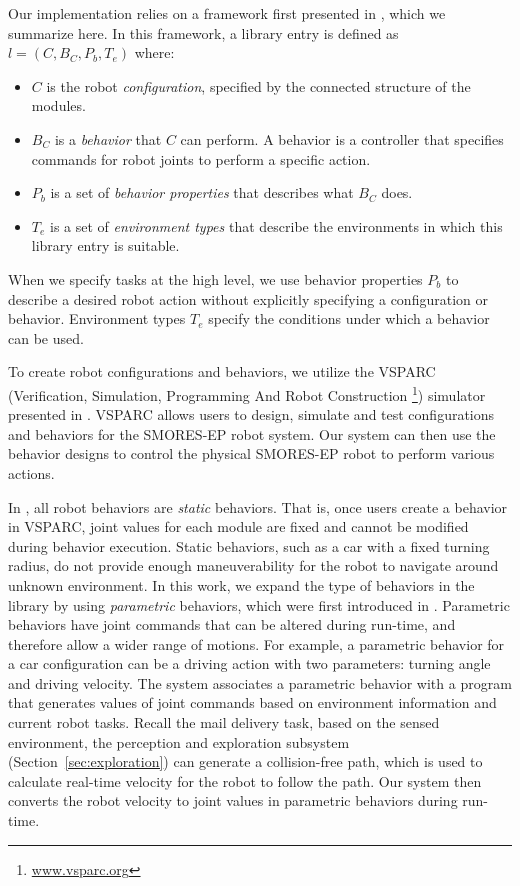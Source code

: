 \documentclass[journal]{IEEEtran}
\begin{document}
Our implementation relies on a framework first presented in \cite{Jing2016}, which we summarize here.
In this framework, a library entry is defined as $l = (C,B_C,P_b,T_e)$ where:
\begin{itemize}
\item $C$ is the robot \emph{configuration}, specified by the connected structure of the modules.
\item $B_C$ is a \emph{behavior} that $C$ can perform. A behavior is a controller that specifies commands for robot joints to perform a specific action. 
\item $P_b$ is a set of \emph{behavior properties} that describes what $B_C$ does. 
\item $T_e$ is a set of \emph{environment types} that describe the environments in which this library entry is suitable. 
\end{itemize} 
%
When we specify tasks at the high level, we use behavior properties $P_b$ to describe a desired robot action without explicitly specifying a configuration or behavior.
Environment types $T_e$ specify the conditions under which a behavior can be used.

To create robot configurations and behaviors, we utilize the VSPARC (Verification, Simulation, Programming And Robot Construction \footnote{\url{www.vsparc.org}}) simulator presented in \cite{Jing2016}.
VSPARC allows users to design, simulate and test configurations and behaviors for the SMORES-EP robot system.
Our system can then use the behavior designs to control the physical SMORES-EP robot to perform various actions.

In \cite{Jing2016}, all robot behaviors are \textit{static} behaviors.
That is, once users create a behavior in VSPARC, joint values for each module are fixed and cannot be modified during behavior execution.
Static behaviors, such as a car with a fixed turning radius, do not provide enough maneuverability for the robot to navigate around unknown environment.
In this work, we expand the type of behaviors in the library by using \textit{parametric} behaviors, which were first introduced in \cite{JingAURO2017}.
Parametric behaviors have joint commands that can be altered during run-time, and therefore allow a wider range of motions.
For example, a parametric behavior for a car configuration can be a driving action with two parameters: turning angle and driving velocity.  
The system associates a parametric behavior with a program that generates values of joint commands based on environment information and current robot tasks.
Recall the mail delivery task, based on the sensed environment, the perception and exploration subsystem (Section~\ref{sec:exploration}) can generate a collision-free path, which is used to calculate real-time velocity for the robot to follow the path.
Our system then converts the robot velocity to joint values in parametric behaviors during run-time.
\end{document}
